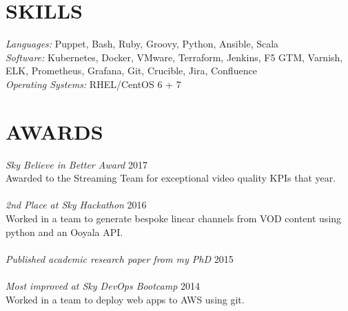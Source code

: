 \documentclass[margin]{res}
\begin{document}
\begin{resume}
\section{SKILLS}
	{\sl Languages:} Puppet, Bash, Ruby, Groovy, Python, Ansible, Scala \\
	{\sl Software:} Kubernetes, Docker, VMware, Terraform, Jenkins, F5 GTM,
	Varnish, ELK, Prometheus, Grafana, Git, Crucible, Jira, Confluence \\
        {\sl Operating Systems:} RHEL/CentOS 6 + 7 \\
 
\section{AWARDS}
	{\sl Sky Believe in Better Award} \hfill 2017 \\
	Awarded to the Streaming Team for exceptional video quality KPIs that year. \\
	\\
	{\sl 2nd Place at Sky Hackathon} \hfill 2016 \\
	Worked in a team to generate bespoke linear channels from VOD content using python and an Ooyala API. \\
	\\
	{\sl Published academic research paper from my PhD} \hfill 2015 \\
	\\
	{\sl Most improved at Sky DevOps Bootcamp} \hfill 2014 \\
	Worked in a team to deploy web apps to AWS using git.

\end{resume}
\end{document}
